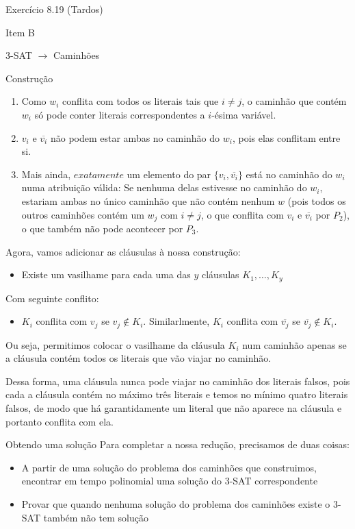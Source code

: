 \documentclass[presentation]{beamer}
\begin{document}
\begin{frame}[fragile,label=sec-6]{Exercício 8.19 (Tardos)}
\begin{block}{Item B}
\begin{block}{3-SAT $\to$ Caminhões}
\begin{block}{Construção}
\begin{enumerate}[($P_1$)]
\item Como $w_i$ conflita com todos os literais tais que
$i \neq j$, o caminhão que contém $w_i$ só pode conter literais
correspondentes a $i$-ésima variável.

\item $v_i$ e $\overline{v_i}$ não
podem estar ambas no caminhão do $w_i$, pois elas conflitam entre si.

\item Mais ainda, $\textit{exatamente}$ um elemento do par $\{v_i,
\overline{v_i}\}$ está no caminhão do $w_i$ numa atribuição válida: Se
nenhuma delas estivesse no caminhão do $w_i$, estariam ambas no único
caminhão que não contém nenhum $w$ (pois todos os outros caminhões
contém um $w_j$ com $i \neq j$, o que conflita com $v_i$ e
$\overline{v_i}$ por $P_2$), o que também não pode acontecer por $P_3$.
\end{enumerate}



Agora, vamos adicionar as cláusulas à nossa construção:

\begin{itemize}
\item Existe um vasilhame para cada uma das $y$ cláusulas $K_1, \ldots, K_y$
\end{itemize}

Com seguinte conflito:

\begin{itemize}
\item $K_i$ conflita com $v_j$ se $v_j \not\in K_i$. Similarlmente, $K_i$
  conflita com $\overline{v_j}$ se $\overline{v_j} \not\in K_i$.
\end{itemize}

Ou seja, permitimos colocar o vasilhame da cláusula $K_i$ num caminhão
apenas se a cláusula contém todos os literais que vão viajar no
caminhão.

Dessa forma, uma cláusula nunca pode viajar no caminhão dos literais
falsos, pois cada a cláusula contém no máximo três literais e temos no
mínimo quatro literais falsos, de modo que há garantidamente um
literal que não aparece na cláusula e portanto conflita com ela.
\end{block}

\begin{block}{Obtendo uma solução}
Para completar a nossa redução, precisamos de duas coisas:
\begin{itemize}
\item A partir de uma solução do problema dos caminhões que construimos,
encontrar em tempo polinomial uma solução do 3-SAT correspondente
\item Provar que quando nenhuma solução do problema dos caminhões existe o
3-SAT também não tem solução
\end{itemize}


\end{block}
\end{block}
\end{block}
\end{frame}
\end{document}
